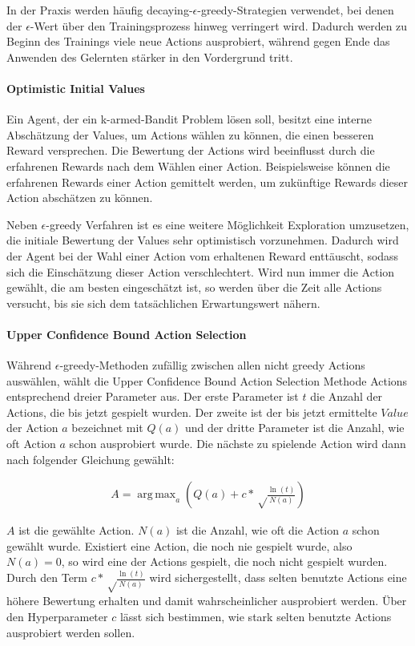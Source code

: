 \documentclass[11pt]{scrartcl}
\DeclareMathOperator*{\argmax}{arg\,max}
\begin{document}
In der Praxis werden häufig decaying-$\epsilon$-greedy-Strategien verwendet, bei denen der
$\epsilon$-Wert über den Trainingsprozess hinweg verringert wird. Dadurch werden zu Beginn
des Trainings viele neue Actions ausprobiert, während gegen Ende das Anwenden des
Gelernten stärker in den Vordergrund tritt.

\paragraph{Optimistic Initial Values}
Ein Agent, der ein k-armed-Bandit Problem lösen soll, besitzt eine interne Abschätzung der
Values, um Actions wählen zu können, die einen besseren Reward versprechen. Die
Bewertung der Actions wird beeinflusst durch die erfahrenen Rewards nach dem Wählen einer
Action. Beispielsweise können die erfahrenen Rewards einer Action gemittelt werden, um
zukünftige Rewards dieser Action abschätzen zu können.

Neben $\epsilon$-greedy Verfahren ist es eine weitere Möglichkeit Exploration umzusetzen,
die initiale Bewertung der Values sehr optimistisch vorzunehmen. Dadurch wird der Agent
bei der Wahl einer Action vom erhaltenen Reward \grqq enttäuscht\grqq, sodass sich die
Einschätzung dieser Action verschlechtert. Wird nun immer die Action gewählt, die am
besten eingeschätzt ist, so werden über die Zeit alle Actions versucht, bis sie sich dem
tatsächlichen Erwartungswert nähern.

\paragraph{Upper Confidence Bound Action Selection}
Während $\epsilon$-greedy-Methoden zufällig zwischen allen nicht greedy Actions
auswählen, wählt die Upper Confidence Bound Ac\-tion Selection Methode Actions entsprechend
dreier Parameter aus.
Der erste Parameter ist $t$ die Anzahl der Actions, die bis jetzt gespielt wurden. Der
zweite ist der bis jetzt ermittelte $Value$ der Action $a$ bezeichnet mit $Q(a)$ und der
dritte Parameter ist die Anzahl, wie oft Action $a$ schon ausprobiert wurde. Die nächste
zu spielende Action wird dann nach folgender Gleichung gewählt:

\begin{align}
A = \argmax_a\left( Q(a) + c*\sqrt\frac{\ln(t)}{N(a)} \right)
\end{align}

$A$ ist die gewählte Action. $N(a)$ ist die Anzahl, wie oft die Action $a$ schon gewählt
wurde. Existiert eine Action, die noch nie gespielt wurde, also $N(a)=0$, so wird eine der
Actions gespielt, die noch nicht gespielt wurden. Durch den Term
$c*\sqrt\frac{\ln(t)}{N(a)}$ wird sichergestellt, dass selten benutzte Actions eine höhere
Bewertung erhalten und damit wahrscheinlicher ausprobiert werden. Über den Hyperparameter
$c$ lässt sich bestimmen, wie stark selten benutzte Actions ausprobiert werden sollen.
\end{document}
